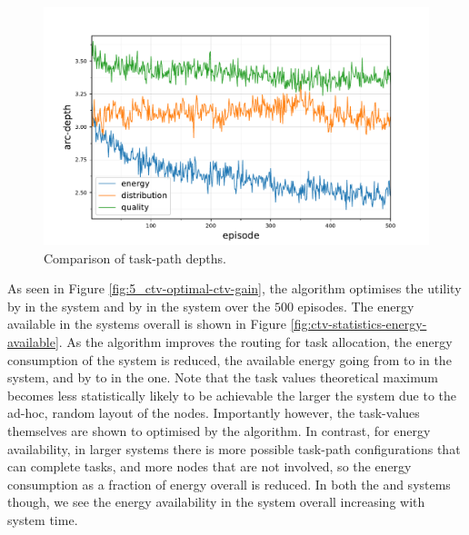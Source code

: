 \begin{figure}[ht]
	\begin{minipage}{.49\textwidth}
		\centering
		\includegraphics[width=1.0\linewidth,trim={25pt 0pt 50pt 0pt},clip]{5.19_ctv-arc-depth-comparison}
		\caption{Comparison of task-path depths.}
		\label{fig:ctv-arc-depth-comparison}
	\end{minipage}\hfill%
\begin{minipage}{.49\textwidth}
\end{minipage}
\end{figure}

As seen in Figure \ref{fig:5_ctv-optimal-ctv-gain}, the \algorithmBalanced{}{} algorithm optimises the utility by \resultsCTVBalancedDiff{}{}  in the \simulationSimple{}{} system and by \resultsCTVBalancedExtDiff{}{} in the \simulationExtended{}{} system over the $500$ episodes. The energy available in the systems overall is shown in Figure \ref{fig:ctv-statistics-energy-available}. As the algorithm improves the routing for task allocation, the energy consumption of the system is reduced, the available energy going from \resultsEnergyBalancedStart{}{} to \resultsEnergyBalancedEnd{}{} in the \simulationSimple{}{} system, and by \resultsEnergyBalancedExtStart{}{} to \resultsEnergyBalancedExtEnd{}{} in the \simulationExtended{}{} one. Note that the task values theoretical maximum becomes less statistically likely to be achievable the larger the system due to the ad-hoc, random layout of the nodes. Importantly however, the task-values themselves are shown to optimised by the algorithm. In contrast, for energy availability, in larger systems there is more possible task-path configurations that can complete tasks, and more nodes that are not involved, so the  energy consumption as a fraction of energy overall is reduced. In both the \simulationSimple{}{} and \simulationExtended{}{} systems though, we see the energy availability in the system overall increasing with system time.

